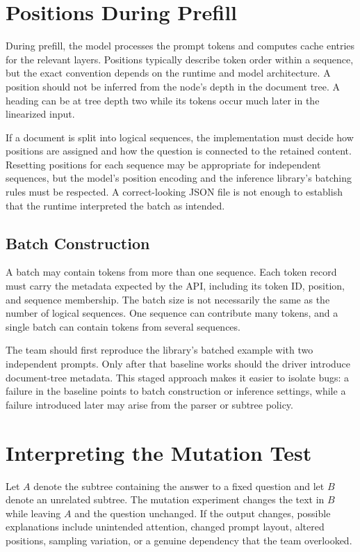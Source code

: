 \documentclass{article}
\begin{document}
\section{Positions During Prefill}
During prefill, the model processes the prompt tokens and computes cache entries for the relevant layers. Positions typically describe token order within a sequence, but the exact convention depends on the runtime and model architecture. A position should not be inferred from the node's depth in the document tree. A heading can be at tree depth two while its tokens occur much later in the linearized input.

If a document is split into logical sequences, the implementation must decide how positions are assigned and how the question is connected to the retained content. Resetting positions for each sequence may be appropriate for independent sequences, but the model's position encoding and the inference library's batching rules must be respected. A correct-looking JSON file is not enough to establish that the runtime interpreted the batch as intended.

\subsection{Batch Construction}
A batch may contain tokens from more than one sequence. Each token record must carry the metadata expected by the API, including its token ID, position, and sequence membership. The batch size is not necessarily the same as the number of logical sequences. One sequence can contribute many tokens, and a single batch can contain tokens from several sequences.

The team should first reproduce the library's batched example with two independent prompts. Only after that baseline works should the driver introduce document-tree metadata. This staged approach makes it easier to isolate bugs: a failure in the baseline points to batch construction or inference settings, while a failure introduced later may arise from the parser or subtree policy.

\section{Interpreting the Mutation Test}
Let $A$ denote the subtree containing the answer to a fixed question and let $B$ denote an unrelated subtree. The mutation experiment changes the text in $B$ while leaving $A$ and the question unchanged. If the output changes, possible explanations include unintended attention, changed prompt layout, altered positions, sampling variation, or a genuine dependency that the team overlooked.
\end{document}
